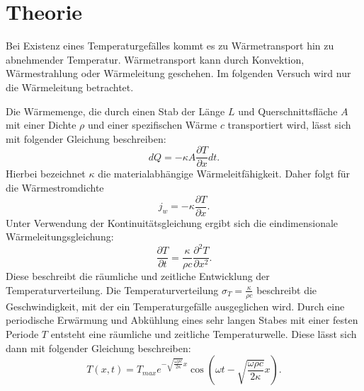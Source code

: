 \section{Theorie}
\label{sec:theorie}
Bei Existenz eines Temperaturgefälles kommt es zu Wärmetransport hin zu
abnehmender Temperatur. Wärmetransport kann durch Konvektion, Wärmestrahlung oder
Wärmeleitung geschehen. Im folgenden Versuch wird nur die Wärmeleitung betrachtet.

Die Wärmemenge, die durch einen Stab der Länge $L$ und Querschnittsfläche $A$
mit einer Dichte $\rho$ und einer spezifischen Wärme $c$ transportiert wird,
lässt sich mit folgender Gleichung beschreiben:
\begin{equation}
  dQ = - \kappa A \frac{\partial T}{\partial x} dt.
  \label{eqn:wärmemenge}
\end{equation}
Hierbei bezeichnet $\kappa$ die materialabhängige Wärmeleitfähigkeit.
Daher folgt für die Wärmestromdichte
\begin{equation}
  j_w = - \kappa \frac{\partial T}{\partial x}.
  \label{eqn:wärmestromdichte}
\end{equation}
Unter Verwendung der Kontinuitätsgleichung ergibt sich die eindimensionale
Wärmeleitungsgleichung:
\begin{equation}
  \frac{\partial T}{\partial t} = \frac{\kappa}{\rho c} \frac{\partial^2 T}{\partial x^2}.
  \label{eqn:wärmeleitungsgleichung}
\end{equation}
Diese beschreibt die räumliche und zeitliche Entwicklung der Temperaturverteilung.
Die Temperaturverteilung $\sigma_T = \frac{\kappa}{\rho c}$ beschreibt die
Geschwindigkeit, mit der ein Temperaturgefälle ausgeglichen wird.
Durch eine periodische Erwärmung und Abkühlung eines sehr langen Stabes mit einer
festen Periode $T$ entsteht eine räumliche und zeitliche Temperaturwelle.
Diese lässt sich dann mit folgender Gleichung beschreiben:
\begin{equation}
  T(x,t) = T_{max} e^{-\sqrt{\frac{\omega \rho c}{2 \kappa}} x} \cos{\left(\omega t - \sqrt{\frac{\omega \rho c}{2 \kappa}} x \right)}.
  \label{eqn:temperaturwelle}
\end{equation}
